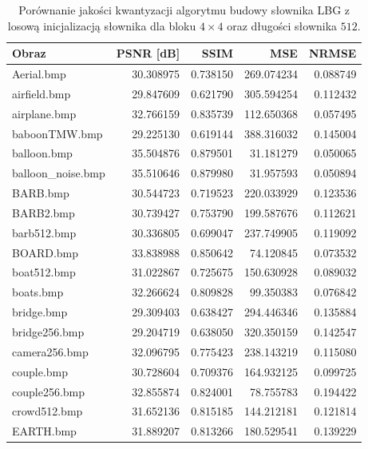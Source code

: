 \documentclass{article}
\begin{document}
\begin{table}[!ht]
  \caption{Porównanie jakości kwantyzacji algorytmu budowy słownika LBG z losową inicjalizacją słownika dla bloku $4 \times 4$ oraz długości słownika $512$.}
  \label{tab:lbg_random}
  \centering
  \begin{tabular}{@{}lrrrr@{}}
    \toprule
    Obraz              & PSNR {[}dB{]} & SSIM     & MSE        & NRMSE    \\ \midrule
    Aerial.bmp         & 30.308975     & 0.738150 & 269.074234 & 0.088749 \\
    airfield.bmp       & 29.847609     & 0.621790 & 305.594254 & 0.112432 \\
    airplane.bmp       & 32.766159     & 0.835739 & 112.650368 & 0.057495 \\
    baboonTMW.bmp      & 29.225130     & 0.619144 & 388.316032 & 0.145004 \\
    balloon.bmp        & 35.504876     & 0.879501 & 31.181279  & 0.050065 \\
    balloon\_noise.bmp & 35.510646     & 0.879980 & 31.957593  & 0.050894 \\
    BARB.bmp           & 30.544723     & 0.719523 & 220.033929 & 0.123536 \\
    BARB2.bmp          & 30.739427     & 0.753790 & 199.587676 & 0.112621 \\
    barb512.bmp        & 30.336805     & 0.699047 & 237.749905 & 0.119092 \\
    BOARD.bmp          & 33.838988     & 0.850642 & 74.120845  & 0.073532 \\
    boat512.bmp        & 31.022867     & 0.725675 & 150.630928 & 0.089032 \\
    boats.bmp          & 32.266624     & 0.809828 & 99.350383  & 0.076842 \\
    bridge.bmp         & 29.309403     & 0.638427 & 294.446346 & 0.135884 \\
    bridge256.bmp      & 29.204719     & 0.638050 & 320.350159 & 0.142547 \\
    camera256.bmp      & 32.096795     & 0.775423 & 238.143219 & 0.115080 \\
    couple.bmp         & 30.728604     & 0.709376 & 164.932125 & 0.099725 \\
    couple256.bmp      & 32.855874     & 0.824001 & 78.755783  & 0.194422 \\
    crowd512.bmp       & 31.652136     & 0.815185 & 144.212181 & 0.121814 \\
    EARTH.bmp          & 31.889207     & 0.813266 & 180.529541 & 0.139229 \\

\end{tabular}
\end{table}
\end{document}
